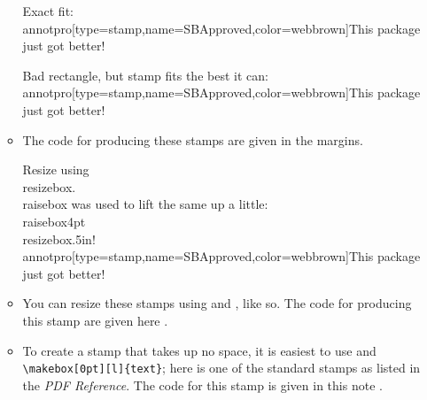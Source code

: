 \documentclass[12pt]{article}
\begin{document}
\begin{itemize}
\begin{itemize}
\smallskip

\begin{defineJS}{\annotstampi}
Exact fit:
\\annotpro[type=stamp,name=SBApproved,color=webbrown]{This package just got better!}
\end{defineJS}
\begin{defineJS}{\annotstampii}
Bad rectangle, but stamp fits the best it can:
\\annotpro[type=stamp,name=SBApproved,color=webbrown]{This package just got better!}
\end{defineJS}

\previewfalse

        \item[] The code for producing these stamps are given in the margins.
        \annotpro[margin,readonly,margintext={\centering Good Fit}]{\annotstampi}%
        \annotpro[margin,readonly,margintext={\centering Bad Fit}]{\annotstampii}%

\begin{defineJS}{\annotstampiii}
Resize using \\resizebox. \\raisebox was used to lift the same up a little:
\\raisebox{4pt}{\\resizebox{.5in}{!}{\\annotpro[type=stamp,name=SBApproved,color=webbrown]{This package just got better!}}}
\end{defineJS}

    \item[] You can resize these stamps using  and , like so.
    \enspace The code for producing this stamp are given here \annotpro{\annotstampiii}.

\begin{defineJS}{\annotstampiv}
\end{defineJS}

\item To create a stamp that takes up no space, it is easiest to use  and \verb!\makebox[0pt][l]{text}!;
    here is one of the standard stamps as listed in the \textsl{PDF Reference}. The code for this stamp is given
    in this note \annotpro{\annotstampiv}.
\end{itemize}


\end{itemize}
\end{document}
